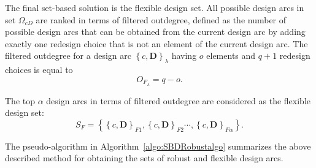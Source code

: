 The final set-based solution is the flexible design set. All possible design arcs in set $\Omega_{cD}$ are ranked in terms of filtered outdegree, defined as the number of possible design arcs that can be obtained from the current design arc by adding exactly one redesign choice that is not an element of the current design arc. The filtered outdegree for a design arc $\left\{c,\mathbf{D}\right\}_\lambda$ having $o$ elements and $q + 1$ redesign choices is equal to
%
\begin{equation} \label{eq:filteredoutdegree}
	O_{F_{\lambda}} = q - o.
\end{equation}

The top $\alpha$ design arcs in terms of filtered outdegree are considered as the flexible design set:
%
\begin{equation} \label{eq:SBDflexible}
	S_F = \left\{\left\{c,\mathbf{D}\right\}_{F1},\left\{c,\mathbf{D}\right\}_{F2}\cdots,\left\{c,\mathbf{D}\right\}_{F\alpha}\right\}.
\end{equation}

The pseudo-algorithm in Algorithm~\ref{algo:SBDRobustalgo} summarizes the above described method for obtaining the sets of robust and flexible design arcs.

